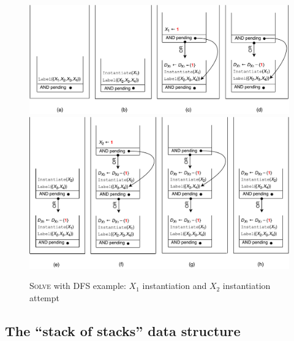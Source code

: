 \documentclass{ws-ijait}
\begin{document}
\begin{figure}
  \includegraphics[width=\textwidth]{figures/stacks/abcd}
  \includegraphics[width=\textwidth]{figures/stacks/efgh}
  \caption{\textsc{Solve} with DFS example: $X_1$
           instantiation and $X_2$ instantiation
           attempt\label{a2h}}
\end{figure}

\subsection{The ``stack of stacks'' data structure}
\end{document}

